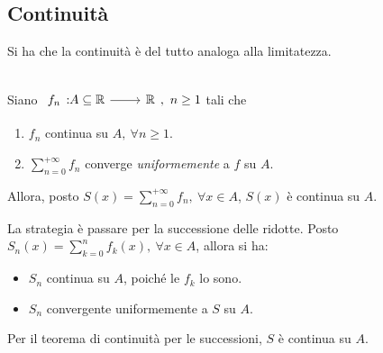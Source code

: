 \subsection{Continuità}
Si ha che la continuità è del tutto analoga alla limitatezza.
\begin{theorema}~{}\\
	Siano $\funz{f_n}{A\subseteq\realset}{\realset},\ n\geq 1$ tali che
	\begin{enumerate}
		\item $f_n$ continua su $A,\ \forall n\geq 1$.
		\item $\displaystyle\sum_{n=0}^{+\infty}f_n$ converge \textit{uniformemente} a $f$ su $A$.
	\end{enumerate}
	Allora, posto $\displaystyle S\left(x\right)=\sum_{n=0}^{+\infty}f_n,\ \forall x\in A$, $S\left(x\right)$ è continua su $A$.
\end{theorema}
\begin{demonstration}
	La strategia è passare per la successione delle ridotte.
	Posto $\displaystyle S_n\left(x\right)=\sum_{k=0}^{n}f_k\left(x\right),\ \forall x\in A$, allora si ha:
	\begin{itemize}
		\item $S_n$ continua su $A$, poiché le $f_k$ lo sono.
		\item $S_n$ convergente uniformemente a $S$ su $A$.
	\end{itemize}
	Per il teorema di continuità per le successioni, $S$ è continua su $A$.
\end{demonstration}
